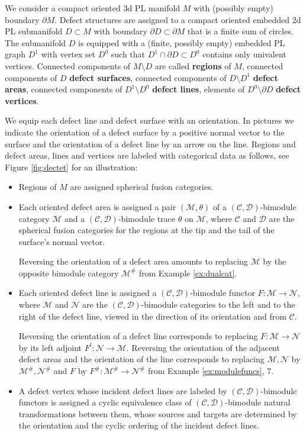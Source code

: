 \documentclass[1.5pt, a4paper]{article}
\newcommand{\mac}{\mathcal C}
\newcommand{\mad}{\mathcal D}
\newcommand{\mam}{\mathcal M}
\newcommand{\man}{\mathcal N}
\begin{document}
We consider a compact oriented 3d PL manifold  $M$ with (possibly empty) boundary $\partial M$. Defect structures are assigned to a compact  oriented embedded 2d PL submanifold $D\subset M$ with boundary  $\partial D\subset \partial M$ that is a finite sum of circles. The submanifold $D$ is equipped with a (finite, possibly empty) embedded PL graph $D^1$ with vertex set $D^0$  such that $D^1\cap \partial D\subset D^0$ contains only univalent vertices. 
Connected components of $M\setminus D$ are called {\bf regions} of $M$, 
connected  components of $D$  {\bf defect surfaces}, connected components of $D\setminus D^1$ {\bf defect areas}, connected components of $D^1\setminus D^0$ {\bf defect lines},  elements of $D^0\setminus \partial D$ {\bf defect vertices}. 


We equip each defect line and defect surface with an orientation. In pictures we indicate the orientation of a defect surface by a positive normal vector to the surface  and the orientation of a defect line by an arrow on the line.
Regions and  defect areas,   lines and  vertices are labeled with categorical data as follows, see Figure \ref{fig:dectet} for an illustration:
\begin{itemize}
\item Regions of $M$ are assigned spherical fusion categories.
\item Each oriented defect area is assigned a pair $(\mam,\theta)$ of a  $(\mac,\mad)$-bimodule category $\mam$ and a $(\mac,\mad)$-bimodule trace $\theta$ on $\mam$, where $\mac$ and $\mad$ are the spherical fusion categories for  the regions at the tip and the tail of the surface's normal vector.

Reversing the orientation of a defect area amounts to replacing  $\mam$ by the opposite bimodule category $\mam^\#$ from Example \ref{ex:dualcat}.

\item  Each oriented defect line is assigned a $(\mac,\mad)$-bimodule functor $F:\mam\to\man$, where $\mam$ and $\man$ are the $(\mac,\mad)$-bimodule categories 
to the left and to the right of the defect line, viewed in the direction of its orientation and from $\mac$.

Reversing the orientation of a defect line corresponds to replacing  $F:\mam\to\man$ by its left adjoint $F^l:\man\to\mam$. Reversing the orientation of the adjacent defect areas and the orientation of the line corresponds to replacing $\mam,\man$ by  $\mam^\#, \man^\#$ and  $F$ by  $F^\#:\mam^\#\to\man^\#$ from Example \ref{ex:modulefuncs}, 7.

\item A defect vertex whose incident defect lines are labeled by  $(\mac,\mad)$-bimodule functors is assigned a cyclic equivalence class of $(\mac,\mad)$-bimodule natural transformations between them, whose sources and targets are determined by the orientation and the cyclic ordering of the incident defect lines. 

\end{itemize}
\end{document}
